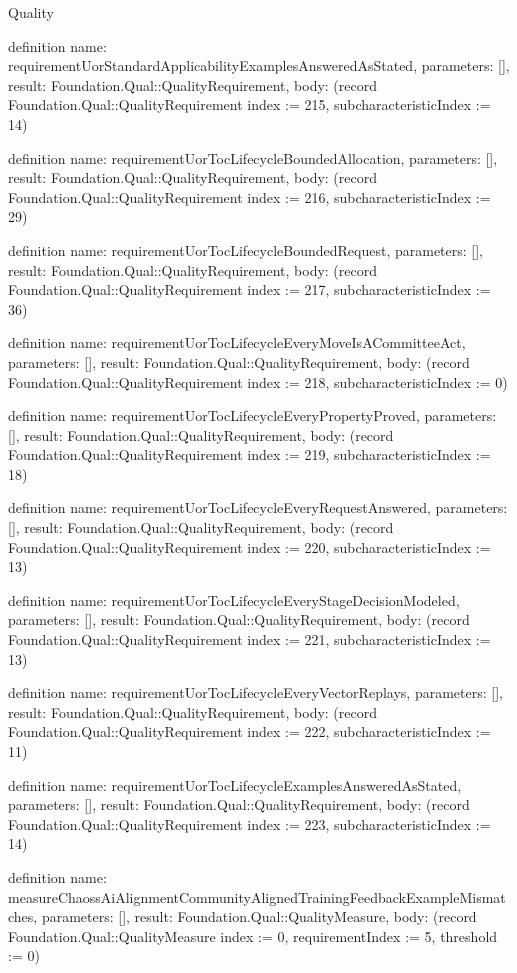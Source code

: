\begin{lexlean}{Quality}
\begin{semanticmodule}
definition{
  name: requirementUorStandardApplicabilityExamplesAnsweredAsStated,
  parameters: [],
  result: Foundation.Qual::QualityRequirement,
  body: (record Foundation.Qual::QualityRequirement {index := 215, subcharacteristicIndex := 14})
}

definition{
  name: requirementUorTocLifecycleBoundedAllocation,
  parameters: [],
  result: Foundation.Qual::QualityRequirement,
  body: (record Foundation.Qual::QualityRequirement {index := 216, subcharacteristicIndex := 29})
}

definition{
  name: requirementUorTocLifecycleBoundedRequest,
  parameters: [],
  result: Foundation.Qual::QualityRequirement,
  body: (record Foundation.Qual::QualityRequirement {index := 217, subcharacteristicIndex := 36})
}

definition{
  name: requirementUorTocLifecycleEveryMoveIsACommitteeAct,
  parameters: [],
  result: Foundation.Qual::QualityRequirement,
  body: (record Foundation.Qual::QualityRequirement {index := 218, subcharacteristicIndex := 0})
}

definition{
  name: requirementUorTocLifecycleEveryPropertyProved,
  parameters: [],
  result: Foundation.Qual::QualityRequirement,
  body: (record Foundation.Qual::QualityRequirement {index := 219, subcharacteristicIndex := 18})
}

definition{
  name: requirementUorTocLifecycleEveryRequestAnswered,
  parameters: [],
  result: Foundation.Qual::QualityRequirement,
  body: (record Foundation.Qual::QualityRequirement {index := 220, subcharacteristicIndex := 13})
}

definition{
  name: requirementUorTocLifecycleEveryStageDecisionModeled,
  parameters: [],
  result: Foundation.Qual::QualityRequirement,
  body: (record Foundation.Qual::QualityRequirement {index := 221, subcharacteristicIndex := 13})
}

definition{
  name: requirementUorTocLifecycleEveryVectorReplays,
  parameters: [],
  result: Foundation.Qual::QualityRequirement,
  body: (record Foundation.Qual::QualityRequirement {index := 222, subcharacteristicIndex := 11})
}

definition{
  name: requirementUorTocLifecycleExamplesAnsweredAsStated,
  parameters: [],
  result: Foundation.Qual::QualityRequirement,
  body: (record Foundation.Qual::QualityRequirement {index := 223, subcharacteristicIndex := 14})
}

definition{
  name: measureChaossAiAlignmentCommunityAlignedTrainingFeedbackExampleMismatches,
  parameters: [],
  result: Foundation.Qual::QualityMeasure,
  body: (record Foundation.Qual::QualityMeasure {index := 0, requirementIndex := 5, threshold := 0})
}


\end{semanticmodule}
\end{lexlean}
